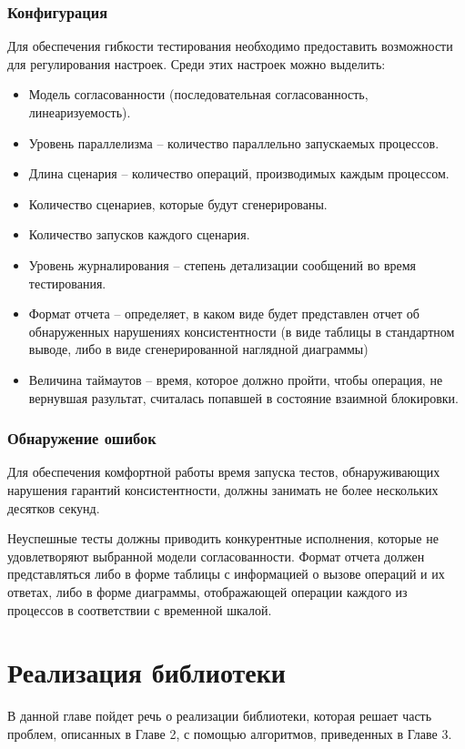 \documentclass[14pt, openany]{book}
\begin{document}
\subsection{Конфигурация}
Для обеспечения гибкости тестирования необходимо предоставить возможности для регулирования настроек. Среди этих настроек можно выделить:
\begin{itemize}
    \item Модель согласованности (последовательная согласованность, линеаризуемость).
    \item Уровень параллелизма -- количество параллельно запускаемых процессов.
    \item Длина сценария -- количество операций, производимых каждым процессом.
    \item Количество сценариев, которые будут сгенерированы.
    \item Количество запусков каждого сценария.
    \item Уровень журналирования -- степень детализации сообщений во время тестирования.
    \item Формат отчета -- определяет, в каком виде будет представлен отчет об обнаруженных нарушениях консистентности (в виде таблицы в стандартном выводе, либо в виде сгенерированной наглядной диаграммы)
    \item Величина таймаутов -- время, которое должно пройти, чтобы операция, не вернувшая разультат, считалась попавшей в состояние взаимной блокировки.
\end{itemize}

\subsection{Обнаружение ошибок}
Для обеспечения комфортной работы время запуска тестов, обнаруживающих нарушения гарантий консистентности, должны занимать не более нескольких десятков секунд.\par
Неуспешные тесты должны приводить конкурентные исполнения, которые не удовлетворяют выбранной модели согласованности. Формат отчета должен представляться либо в форме таблицы с информацией о вызове операций и их ответах, либо в форме диаграммы, отображающей операции каждого из процессов в соответствии с временной шкалой.

\chapter{Реализация библиотеки}
В данной главе пойдет речь о реализации библиотеки, которая решает часть проблем, описанных в Главе 2, с помощью алгоритмов, приведенных в Главе 3.
\end{document}
